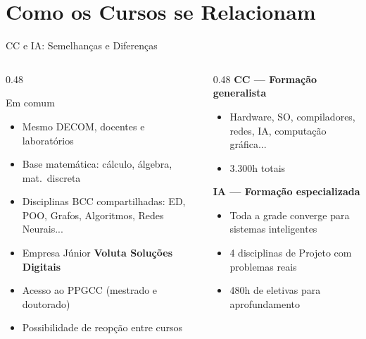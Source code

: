 \documentclass[aspectratio=169]{beamer}
\newcommand{\cc}[1]{\textcolor{mcc}{\textbf{#1}}}
\newcommand{\ia}[1]{\textcolor{mia}{\textbf{#1}}}
\begin{document}
\section{Como os Cursos se Relacionam}

\begin{frame}{CC e IA: Semelhanças e Diferenças}
  \begin{columns}[T]
    \begin{column}{0.48\textwidth}
      \begin{block}{Em comum}
        \begin{itemize}\setlength\itemsep{2pt}
          \item Mesmo DECOM, docentes e laboratórios
          \item Base matemática: cálculo, álgebra, mat.\ discreta
          \item Disciplinas BCC compartilhadas: ED, POO, Grafos, Algoritmos, Redes Neurais...
          \item Empresa Júnior \textbf{Voluta Soluções Digitais}
          \item Acesso ao PPGCC (mestrado e doutorado)
          \item Possibilidade de reopção entre cursos
        \end{itemize}
      \end{block}
    \end{column}
    \begin{column}{0.48\textwidth}
      \cc{CC --- Formação generalista}
      \begin{itemize}\setlength\itemsep{1pt}
        \item Hardware, SO, compiladores, redes, IA, computação gráfica...
        \item 3.300h totais
      \end{itemize}
      \vspace{0.3cm}
      \ia{IA --- Formação especializada}
      \begin{itemize}\setlength\itemsep{1pt}
        \item Toda a grade converge para sistemas inteligentes
        \item 4 disciplinas de Projeto com problemas reais
        \item 480h de eletivas para aprofundamento
      \end{itemize}
    \end{column}
  \end{columns}
\end{frame}
\end{document}
